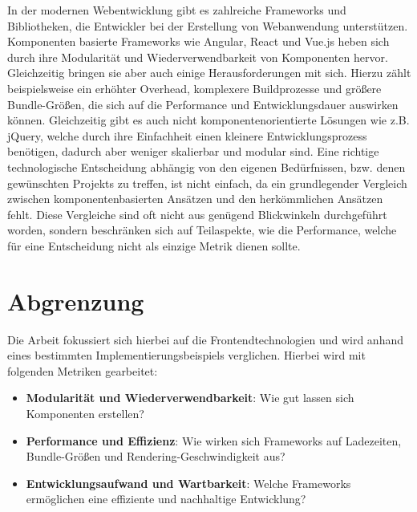 \documentclass[oneside]{ausarbeitung}
\begin{document}
In der modernen Webentwicklung gibt es zahlreiche Frameworks und Bibliotheken, die Entwickler bei der Erstellung von Webanwendung unterstützen. Komponenten basierte Frameworks wie Angular, React und Vue.js heben sich durch ihre Modularität und Wiederverwendbarkeit von Komponenten hervor. Gleichzeitig bringen sie aber auch einige Herausforderungen mit sich. Hierzu zählt beispielsweise ein erhöhter Overhead, komplexere Buildprozesse und größere Bundle-Größen, die sich auf die Performance und Entwicklungsdauer auswirken können.
Gleichzeitig gibt es auch nicht komponentenorientierte Lösungen wie z.B. jQuery, welche durch ihre Einfachheit einen kleinere Entwicklungsprozess benötigen, dadurch aber weniger skalierbar und modular sind. 
Eine richtige technologische Entscheidung abhängig von den eigenen Bedürfnissen, bzw. denen gewünschten Projekts zu treffen, ist nicht einfach, da ein grundlegender Vergleich zwischen komponentenbasierten Ansätzen und den herkömmlichen Ansätzen fehlt. Diese Vergleiche sind oft nicht aus genügend Blickwinkeln durchgeführt worden, sondern beschränken sich auf Teilaspekte, wie die Performance, welche für eine Entscheidung nicht als einzige Metrik dienen sollte. 

\section{Abgrenzung}

Die Arbeit fokussiert sich hierbei auf die Frontendtechnologien und wird anhand eines bestimmten Implementierungsbeispiels verglichen. Hierbei wird mit folgenden Metriken gearbeitet: 
\begin{itemize}
    \item \textbf{Modularität und Wiederverwendbarkeit}:  
          Wie gut lassen sich Komponenten erstellen?
    \item \textbf{Performance und Effizienz}:  
          Wie wirken sich Frameworks auf Ladezeiten, Bundle-Größen und Rendering-Geschwindigkeit aus?
    \item \textbf{Entwicklungsaufwand und Wartbarkeit}:  
          Welche Frameworks ermöglichen eine effiziente und nachhaltige Entwicklung?
\end{itemize}
\end{document}

